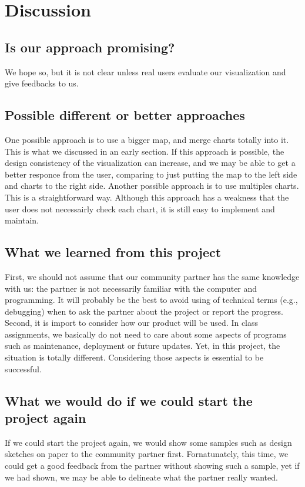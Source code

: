 \documentclass[a4paper]{article}
\begin{document}
\section{Discussion}
\subsection{Is our approach promising?}
We hope so, but it is not clear unless real users evaluate our visualization and give feedbacks to us.

\subsection{Possible different or better approaches}
One possible approach is to use a bigger map, and merge charts totally into it. This is what we discussed in an early section. If this approach is possible, the design consistency of the visualization can increase, and we may be able to get a better responce from the user, comparing to just putting the map to the left side and charts to the right side. Another possible approach is to use multiples charts. This is a straightforward way. Although this approach has a weakness that the user does not necessairly check each chart, it is still easy to implement and maintain.

\subsection{What we learned from this project}
First, we should not assume that our community partner has the same knowledge with us: the partner is not necessarily familiar with the computer and programming. It will probably be the best to avoid using of technical terms (e.g., debugging) when to ask the partner about the project or report the progress. Second, it is import to consider how our product will be used. In class assignments, we basically do not need to care about some aspects of programs such as maintenance, deployment or future updates. Yet, in this project, the situation is totally different. Considering those aspects is essential to be successful.

\subsection{What we would do if we could start the project again}
If we could start the project again, we would show some samples such as design sketches on paper to the community partner first. Fornatunately, this time, we could get a good feedback from the partner without showing such a sample, yet if we had shown, we may be able to delineate what the partner really wanted. 
\end{document}
